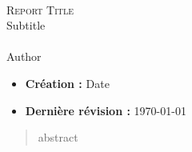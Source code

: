 \documentclass[a4]{report}
\begin{document}
	
	\begin{titlepage}
   		
   		\mbox{}\vspace{5\baselineskip}\\
   		\rmfamily\huge
   		\centering
   		\textsc{Report Title} \\[2ex]
   		Subtitle
   		\rmfamily\Large
   		\vspace{1\baselineskip}\\ 		
   		\mbox{}
   		\vspace{5\baselineskip}\\
   		\rmfamily\Large
   		Author
   		\vspace{1\baselineskip}\\
		\begin{itemize}
		\item[] \textbf{Création :}  Date
   		\item[] \textbf{Dernière révision :} \today
		\end{itemize}				
		
		\begin{abstract}

abstract
		\end{abstract}
		
   		
	\end{titlepage}
	\setlength{\parindent}{0pt}

\tableofcontents

	
	
	
	\appendix
	
	\listoffigures
	\lstlistoflistings
	 
	
\end{document}
